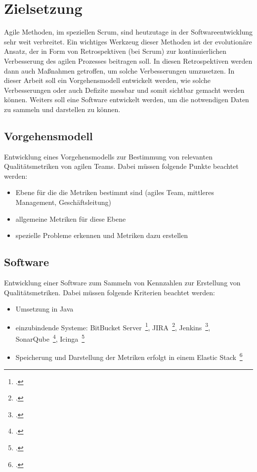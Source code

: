 \chapter{Zielsetzung}

Agile Methoden, im speziellen Scrum, sind heutzutage in der Softwareentwicklung sehr weit verbreitet.
Ein wichtiges Werkzeug dieser Methoden ist der evolutionäre Ansatz, der in Form von Retrospektiven (bei Scrum) zur kontinuierlichen Verbesserung des agilen Prozesses beitragen soll.
In diesen Retrospektiven werden dann auch Maßnahmen getroffen, um solche Verbesserungen umzusetzen.
In dieser Arbeit soll ein Vorgehensmodell entwickelt werden, wie solche Verbesserungen oder auch Defizite messbar und somit sichtbar gemacht werden können.
Weiters soll eine Software entwickelt werden, um die notwendigen Daten zu sammeln und darstellen zu können.

\section{Vorgehensmodell}

Entwicklung eines Vorgehensmodells zur Bestimmung von relevanten Qualitätsmetriken von agilen Teams.
Dabei müssen folgende Punkte beachtet werden:
\begin{itemize}[noitemsep]
    \item Ebene für die die Metriken bestimmt sind (agiles Team, mittleres Management, Geschäftsleitung)
    \item allgemeine Metriken für diese Ebene
    \item spezielle Probleme erkennen und Metriken dazu erstellen
\end{itemize}

\section{Software}

Entwicklung einer Software zum Sammeln von Kennzahlen zur Erstellung von Qualitätsmetriken. 
Dabei müssen folgende Kriterien beachtet werden:
\begin{itemize}[noitemsep]
    \item Umsetzung in Java
    \item einzubindende Systeme: BitBucket Server~\footcite{bitbucket_server}, JIRA~\footcite{jira}, Jenkins~\footcite{jenkins}, SonarQube~\footcite{sonarqube}, Icinga~\footcite{icinga}
    \item Speicherung und Darstellung der Metriken erfolgt in einem Elastic Stack~\footcite{elastic_stack}
\end{itemize}
